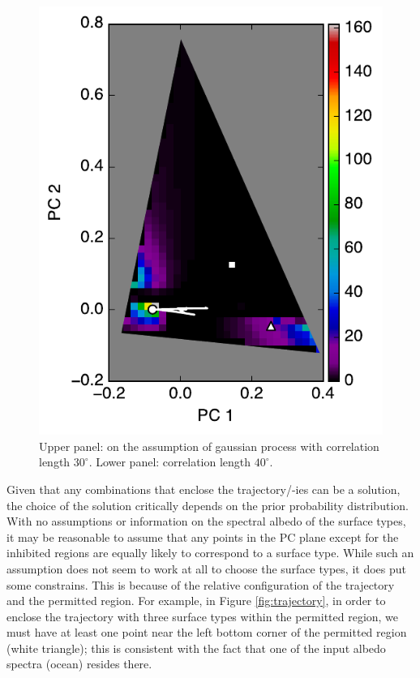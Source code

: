 \documentclass[iop,numberedappendix,apj,]{emulateapj}
\begin{document}
\begin{figure}[tbh!]
\begin{center}
\includegraphics[width=\hsize]{mockdata_90deg_3types_t12_lc_reg_l40deg.pdf}
    \end{center}
    \caption{Upper panel: on the assumption of gaussian process with correlation length $30^{\circ }$. Lower panel: correlation length $40^{\circ }$. }
\label{fig:noreg}
\end{figure}

Given that any combinations that enclose the trajectory/-ies can be a solution, the choice of the solution critically depends on the prior probability distribution. 
With no assumptions or information on the spectral albedo of the surface types, it may be reasonable to assume that any points in the PC plane except for the inhibited regions are equally likely to correspond to a surface type. 
While such an assumption does not seem to work at all to choose the surface types, it does put some constrains. 
This is because of the relative configuration of the trajectory and the permitted region. 
For example, in Figure \ref{fig:trajectory}, in order to enclose the trajectory with three surface types within the permitted region, we must have at least one point near the left bottom corner of the permitted region (white triangle); this is consistent with the fact that one of the input albedo spectra (ocean) resides there. 
\end{document}
